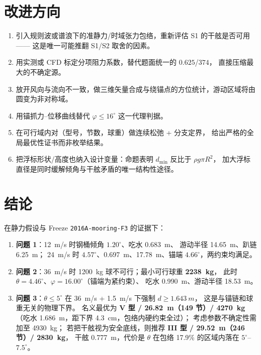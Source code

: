 \documentclass[UTF8,a4paper,zihao=-4]{ctexart}
\begin{document}
\section{改进方向}

\begin{enumerate}[leftmargin=1.6em,itemsep=0.2em]
  \item 引入规则波或谱浪下的准静力/时域张力包络，重新评估 S1 的干舷是否可用——
        这是唯一可能推翻 S1/S2 取舍的因素。
  \item 用实测或 CFD 标定分项阻力系数，替代题面统一的 \(0.625\)/\(374\)，
        直接压缩最大的不确定源。
  \item 放开风向与流向不一致，做三维矢量合成与绕锚点的方位统计，游动区域将由圆变为非对称域。
  \item 用锚抓力--位移曲线替代 \(\varphi\le16^\circ\) 这一代理判据。
  \item 在可行域内对（型号，节数，球重）做连续松弛 + 分支定界，
        给出严格的全局最优性证书而非枚举结果。
  \item 把浮标形状/高度也纳入设计变量：命题表明 \(d_{\min}\) 反比于 \(\rho g\pi R^2\)，
        加大浮标直径是同时缓解倾角与干舷矛盾的唯一结构性途径。
\end{enumerate}

\section{结论}

在静力假设与 Freeze \texttt{2016A-mooring-F3} 的证据下：

\begin{enumerate}[leftmargin=1.6em,itemsep=0.2em]
  \item \textbf{问题 1}：\SI{12}{m/s} 时钢桶倾角 \(1.20^\circ\)、吃水 \SI{0.683}{m}、
        游动半径 \SI{14.65}{m}、趴链 \SI{6.25}{m}；
        \SI{24}{m/s} 时 \(4.57^\circ\)、\SI{0.697}{m}、\SI{17.78}{m}、锚端 \(4.66^\circ\)，两约束均满足。
  \item \textbf{问题 2}：\SI{36}{m/s} 时 \SI{1200}{kg} 球不可行；最小可行球重 \textbf{\SI{2238}{kg}}，
        此时 \(\theta=4.46^\circ\)、\(\varphi=16.00^\circ\)（锚端为紧约束）、
        吃水 \SI{0.990}{m}、游动半径 \SI{18.53}{m}。
  \item \textbf{问题 3}：\(\theta\le5^\circ\) 在 \SI{36}{m/s} + \SI{1.5}{m/s} 下强制 \(d\ge\SI{1.643}{m}\)，
        这是与锚链和球重无关的物理下界。
        名义最优为 \textbf{V 型 / \SI{26.82}{m}（149 节）/ \SI{4270}{kg}}
        （吃水 \SI{1.686}{m}，距下界 \SI{4.3}{cm}，包络内硬约束全过）；
        考虑参数不确定性需加至 \SI{4930}{kg}；
        若把干舷视为安全底线，则推荐 \textbf{III 型 / \SI{29.52}{m}（246 节）/ \SI{2830}{kg}}，
        干舷 \SI{0.777}{m}，代价是 \(\theta\) 在包络 17.9\% 的区域内落在 \(5^\circ\)--\(7.5^\circ\)。
\end{enumerate}
\end{document}
